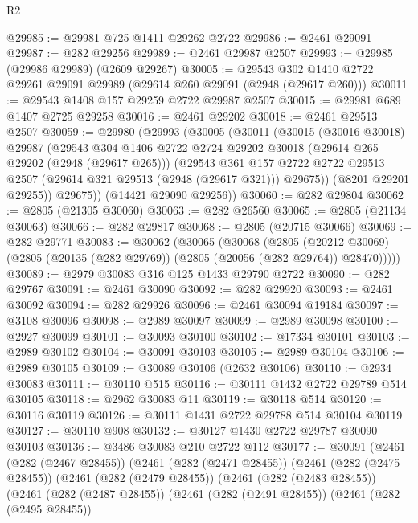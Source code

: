 \begin{lexlean}{R2}
\begin{coremodule}
@29985 := @29981 @725 @1411 @29262 @2722
@29986 := @2461 @29091
@29987 := @282 @29256
@29989 := @2461 @29987 @2507
@29993 := @29985 (@29986 @29989) (@2609 @29267)
@30005 := @29543 @302 @1410 @2722 @29261 @29091 @29989 (@29614 @260 @29091 (@2948 (@29617 @260)))
@30011 := @29543 @1408 @157 @29259 @2722 @29987 @2507
@30015 := @29981 @689 @1407 @2725 @29258
@30016 := @2461 @29202
@30018 := @2461 @29513 @2507
@30059 := @29980
    (@29993
      (@30005
        (@30011
          (@30015
            (@30016 @30018)
            @29987
            (@29543
              @304
              @1406
              @2722
              @2724
              @29202
              @30018
              (@29614 @265 @29202 (@2948 (@29617 @265)))
              (@29543
                @361
                @157
                @2722
                @2722
                @29513
                @2507
                (@29614 @321 @29513 (@2948 (@29617 @321)))
                @29675))
            (@8201 @29201 @29255))
          @29675))
      (@14421 @29090 @29256))
@30060 := @282 @29804
@30062 := @2805 (@21305 @30060)
@30063 := @282 @26560
@30065 := @2805 (@21134 @30063)
@30066 := @282 @29817
@30068 := @2805 (@20715 @30066)
@30069 := @282 @29771
@30083 := @30062
    (@30065
      (@30068
        (@2805
          (@20212 @30069)
          (@2805 (@20135 (@282 @29769)) (@2805 (@20056 (@282 @29764)) @28470)))))
@30089 := @2979 @30083 @316 @125 @1433 @29790 @2722
@30090 := @282 @29767
@30091 := @2461 @30090
@30092 := @282 @29920
@30093 := @2461 @30092
@30094 := @282 @29926
@30096 := @2461 @30094 @19184
@30097 := @3108 @30096
@30098 := @2989 @30097
@30099 := @2989 @30098
@30100 := @2927 @30099
@30101 := @30093 @30100
@30102 := @17334 @30101
@30103 := @2989 @30102
@30104 := @30091 @30103
@30105 := @2989 @30104
@30106 := @2989 @30105
@30109 := @30089 @30106 (@2632 @30106)
@30110 := @2934 @30083
@30111 := @30110 @515
@30116 := @30111 @1432 @2722 @29789 @514 @30105
@30118 := @2962 @30083 @11
@30119 := @30118 @514
@30120 := @30116 @30119
@30126 := @30111 @1431 @2722 @29788 @514 @30104 @30119
@30127 := @30110 @908
@30132 := @30127 @1430 @2722 @29787 @30090 @30103
@30136 := @3486 @30083 @210 @2722 @112
@30177 := @30091
    (@2461
      (@282 (@2467 @28455))
      (@2461
        (@282 (@2471 @28455))
        (@2461
          (@282 (@2475 @28455))
          (@2461
            (@282 (@2479 @28455))
            (@2461
              (@282 (@2483 @28455))
              (@2461
                (@282 (@2487 @28455))
                (@2461
                  (@282 (@2491 @28455))
                  (@2461
                    (@282 (@2495 @28455))

\end{coremodule}
\end{lexlean}
